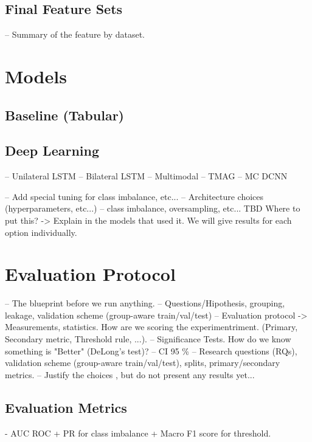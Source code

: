 {%

\subsection{Final Feature Sets}\label{subsec:method-final-feature-sets}
-- Summary of the feature by dataset.

\section{Models}\label{sec:method-models}
\subsection{Baseline (Tabular)}\label{subsec:method-baselines}
\subsection{Deep Learning}\label{subsec:method-deep-learning}
-- Unilateral LSTM
-- Bilateral LSTM
-- Multimodal
-- TMAG
-- MC DCNN

-- Add special tuning for class imbalance, etc...
-- Architecture choices (hyperparameters, etc...)
-- class imbalance, oversampling, etc... TBD Where to put this? -> Explain in the models that used it. We will give results for each option individually.

\section{Evaluation Protocol}\label{sec:method-evaluation-protocol}
-- The blueprint before we run anything.
-- Questions/Hipothesis, grouping, leakage, validation scheme (group-aware train/val/test)
-- Evaluation protocol -> Measurements, statistics. How are we scoring the experimentriment. (Primary, Secondary metric, Threshold rule, ...).
-- Significance Tests. How do we know something is "Better" (DeLong's test)?
-- CI 95 \%
-- Research questions (RQs), validation scheme (group-aware train/val/test), splits, primary/secondary metrics.
-- Justify the choices , but do not present any results yet...

\subsection{Evaluation Metrics}\label{subsec:method-evaluation-metrics}
- AUC ROC + PR for class imbalance + Macro F1 score for threshold.

}
